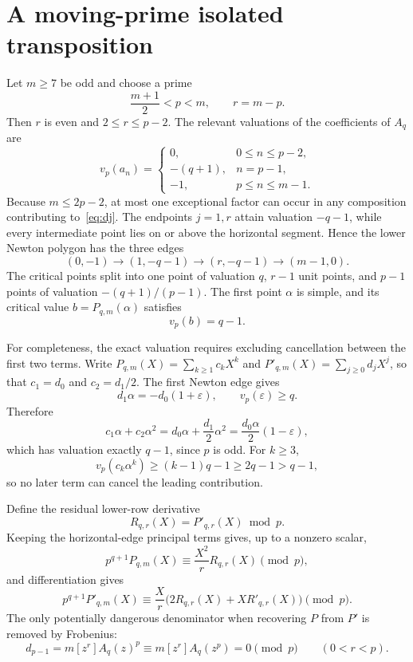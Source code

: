 \section{A moving-prime isolated transposition}

Let $m\ge7$ be odd and choose a prime
\begin{equation}
\frac{m+1}{2}<p<m,
\qquad
r=m-p.
\label{eq:window}
\end{equation}
Then $r$ is even and $2\le r\le p-2$. The relevant valuations of the
coefficients of $A_q$ are
\[
v_p(a_n)=
\begin{cases}
0,&0\le n\le p-2,\\
-(q+1),&n=p-1,\\
-1,&p\le n\le m-1.
\end{cases}
\]
Because $m\le2p-2$, at most one exceptional factor can occur in any
composition contributing to~\eqref{eq:dj}.  The endpoints $j=1,r$ attain
valuation $-q-1$, while every intermediate point lies on or above the
horizontal segment.  Hence the lower Newton polygon has the three edges
\begin{equation}
(0,-1)\longrightarrow(1,-q-1)
\longrightarrow(r,-q-1)\longrightarrow(m-1,0).
\label{eq:threeedge}
\end{equation}
The critical points split into one point of valuation $q$, $r-1$ unit
points, and $p-1$ points of valuation $-(q+1)/(p-1)$. The first point
$\alpha$ is simple, and its critical value $b=P_{q,m}(\alpha)$ satisfies
\begin{equation}
\boxed{v_p(b)=q-1.}
\label{eq:bval}
\end{equation}

For completeness, the exact valuation requires excluding cancellation
between the first two terms.  Write
$P_{q,m}(X)=\sum_{k\ge1}c_kX^k$ and
$P'_{q,m}(X)=\sum_{j\ge0}d_jX^j$, so that $c_1=d_0$ and
$c_2=d_1/2$.  The first Newton edge gives
\[
 d_1\alpha=-d_0(1+\varepsilon),\qquad v_p(\varepsilon)\ge q.
\]
Therefore
\[
 c_1\alpha+c_2\alpha^2
 =d_0\alpha+\frac{d_1}{2}\alpha^2
 =\frac{d_0\alpha}{2}(1-\varepsilon),
\]
which has valuation exactly $q-1$, since $p$ is odd.  For $k\ge3$,
\[
 v_p(c_k\alpha^k)\ge(k-1)q-1\ge2q-1>q-1,
\]
so no later term can cancel the leading contribution.

Define the residual lower-row derivative
\[
R_{q,r}(X)=P'_{q,r}(X)\bmod p.
\]
Keeping the horizontal-edge principal terms gives, up to a nonzero scalar,
\begin{equation}
p^{q+1}P_{q,m}(X)\equiv\frac{X^2}{r}R_{q,r}(X)\pmod p,
\label{eq:lowerP}
\end{equation}
and differentiation gives
\begin{equation}
p^{q+1}P'_{q,m}(X)
\equiv\frac{X}{r}\bigl(2R_{q,r}(X)+XR'_{q,r}(X)\bigr)\pmod p.
\label{eq:lowerPd}
\end{equation}
The only potentially dangerous denominator when recovering $P$ from $P'$ is
removed by Frobenius:
\begin{equation}
d_{p-1}=m[z^r]A_q(z)^p
\equiv m[z^r]A_q(z^p)=0\pmod p
\qquad(0<r<p).
\label{eq:frob}
\end{equation}

